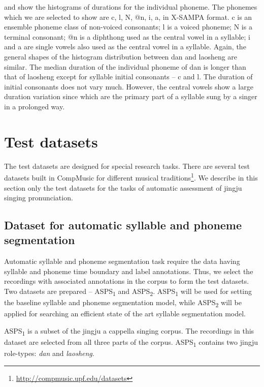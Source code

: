  and  show the histograms of durations for the individual phoneme. The phonemes which we are selected to show are c, l, N, @n, i, a, in X-SAMPA format. c is an ensemble phoneme class of non-voiced consonants; l is a voiced phoneme; N is a terminal consonant; @n is a diphthong used as the central vowel in a syllable; i and a are single vowels also used as the central vowel in a syllable. Again, the general shapes of the histogram distribution between dan and laosheng are similar. The median duration of the individual phoneme of dan is longer than that of laosheng except for syllable initial consonants -- c and l. The duration of initial consonants does not vary much. However, the central vowels show a large duration variation since which are the primary part of a syllable sung by a singer in a prolonged way.

\section{Test datasets}\label{sec:ch4:test_datasets}
The test datasets are designed for special research tasks. There are several test datasets built in CompMusic for different musical traditions\footnote{\url{http://compmusic.upf.edu/datasets}}. We describe in this section only the test datasets for the tasks of automatic assessment of jingju singing pronunciation.

\subsection{Dataset for automatic syllable and phoneme segmentation}\label{sec:ch4:dataset_segmentation}

Automatic syllable and phoneme segmentation task require the data having syllable and phoneme time boundary and label annotations. Thus, we select the recordings with associated annotations in the corpus to form the test datasets. Two datasets are prepared -- ASPS\textsubscript{1} and ASPS\textsubscript{2}. ASPS\textsubscript{1} will be used for setting the baseline syllable and phoneme segmentation model, while ASPS\textsubscript{2} will be applied for searching an efficient state of the art syllable segmentation model.

ASPS\textsubscript{1} is a subset of the jingju a cappella singing corpus. The recordings in this dataset are selected from all three parts of the corpus. ASPS\textsubscript{1} contains two jingju role-types: \textit{dan} and \textit{laosheng}. 

